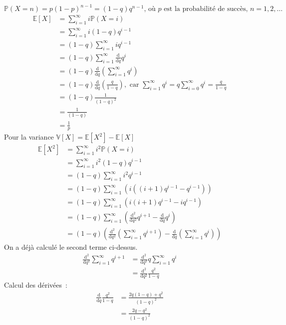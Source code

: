 \label{V-answer-loigeom1}
\(\mathbb{P}(X=n) = p (1-p)^{n-1} = (1-q)q^{n-1} \text{, où } p \text{ est la probabilité de succès, } n=1,2,\ldots\)
\begin{align*}
\mathbb{E}[X]&=\sum_{i=1}^{\infty}i\mathbb{P}(X=i)\\
&=\sum_{i=1}^{\infty} i (1-q)q^{i-1}\\
&=(1-q)\sum_{i=1}^{\infty} iq^{i-1}\\
&=(1-q)\sum_{i=1}^{\infty} \frac{\mathrm{d}}{\mathrm{d} q} q^i\\
&=(1-q)\frac{\mathrm{d}}{\mathrm{d} q}\left(\sum_{i=1}^{\infty}  q^i\right)\\
&=(1-q)\frac{\mathrm{d}}{\mathrm{d} q}\left(\frac{q}{1-q}\right), \text{ car } \sum_{i=1}^{\infty}  q^i = q \sum_{i=0}^{\infty}  q^i = \frac{q}{1-q}\\
&=(1-q)\frac{1}{(1-q)^2} \\
&=\frac{1}{(1-q)}\\
&=\frac{1}{p}
\end{align*} \bigskip Pour la variance
\(\mathbb{V}[X] = \mathbb{E}[X^2]-\mathbb{E}[X]\) \begin{align*}
\mathbb{E}[X^2]&=\sum_{i=1}^{\infty}i^2\mathbb{P}(X=i)\\
&=\sum_{i=1}^{\infty} i^2 (1-q)q^{i-1}\\
&=(1-q)\sum_{i=1}^{\infty} i^2q^{i-1}\\
&=(1-q)\sum_{i=1}^{\infty}\left( i\left((i+1)q^{i-1} - q^{i-1}\right)\right)\\
&=(1-q)\sum_{i=1}^{\infty}\left( i(i+1)q^{i-1} - iq^{i-1}\right)\\
&=(1-q)\sum_{i=1}^{\infty}\left( \frac{\mathrm{d}^2}{\mathrm{d} q^2} q^{i+1} - \frac{\mathrm{d}}{\mathrm{d} q} q^i\right)\\
&=(1-q)\left( \frac{\mathrm{d}^2}{\mathrm{d} q^2}\left(\sum_{i=1}^{\infty}q^{i+1}\right)-\frac{\mathrm{d}}{\mathrm{d} q}\left(\sum_{i=1}^{\infty}  q^i\right)\right)
\end{align*} On a déjà calculé le second terme ci-dessus. \begin{align*}
\frac{\mathrm{d}^2}{\mathrm{d} q^2}\sum_{i=1}^{\infty}q^{i+1} &= \frac{\mathrm{d}^2}{\mathrm{d} q^2}q \sum_{i=1}^{\infty}q^{i}\\
&=\frac{\mathrm{d}^2}{\mathrm{d} q^2}\frac{q^2}{1-q}
\end{align*} Calcul des dérivées~: \begin{align*}
\frac{\mathrm{d}}{\mathrm{d} q}\frac{q^2}{1-q} &= \frac{2q(1-q)+q^2}{(1-q)^2}\\
&= \frac{2q-q^2}{(1-q)^2}
\end{align*}

